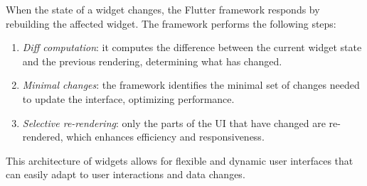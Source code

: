 When the state of a widget changes, the Flutter framework responds by rebuilding the affected widget. 
The framework performs the following steps:
\begin{enumerate}
    \item \textit{Diff computation}: it computes the difference between the current widget state and the previous rendering, determining what has changed.
    \item \textit{Minimal changes}: the framework identifies the minimal set of changes needed to update the interface, optimizing performance.
    \item \textit{Selective re-rendering}: only the parts of the UI that have changed are re-rendered, which enhances efficiency and responsiveness.
\end{enumerate}
This architecture of widgets allows for flexible and dynamic user interfaces that can easily adapt to user interactions and data changes.